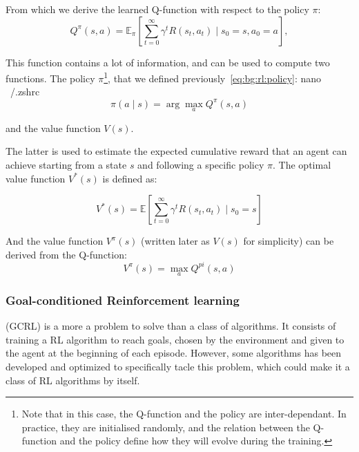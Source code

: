 From which we derive the learned Q-function with respect to the policy $\pi$:
\begin{equation} \label{eq:bg:rl:q_function_wrt_pi}
    Q^{\pi}(s, a) = \mathbb{E}_\pi \left[ \sum_{t=0}^\infty \gamma^t R(s_t, a_t) \mid s_0 = s, a_0 = a \right],
\end{equation}

This function contains a lot of information, and can be used to compute two functions.
The policy $\pi$\footnote{Note that in this case, the Q-function and the policy are inter-dependant.
In practice, they are initialised randomly, and the relation between the Q-function and the policy define how they will
evolve during the training.}, that we defined previously~\ref{eq:bg:rl:policy}:
nano ~/.zshrc
\begin{equation} \label{eq:bg:rl:pi_from_q_function}
    \pi(a \mid s) = \arg\max_a Q^{\pi}(s, a)
\end{equation}

and the value function $V(s)$.

The latter is used to estimate the expected cumulative reward that an agent can achieve starting from a state $s$ and
following a specific policy $\pi$.
The optimal value function $V^*(s)$ is defined as:

\begin{equation} \label{eq:bg:rl:optimal_value_function}
    V^*(s) = \mathbb{E} \left[ \sum_{t=0}^\infty \gamma^t R(s_t, a_t) \mid s_0 = s \right]
\end{equation}

And the value function $V^{\pi}(s)$ (written later as $V(s)$ for simplicity) can be derived from the Q-function:
\begin{equation} \label{eq:bg:rl:value_function}
    V^{\pi}(s) = \max_a Q^{pi}(s, a)
\end{equation}

\subsubsection{Goal-conditioned Reinforcement learning}

 (GCRL) is a more a problem to solve than a class of algorithms.
It consists of training a RL algorithm to reach goals, chosen by the environment and given to the agent at the
beginning of each episode.
However, some algorithms has been developed and optimized to specifically tacle this problem, which could make it a
class of RL algorithms by itself.

